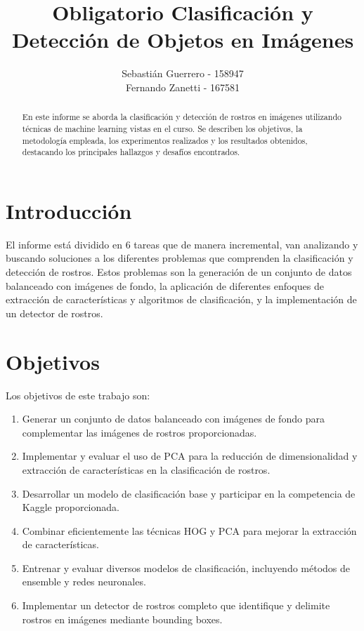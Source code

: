 \documentclass{article}
\title{Obligatorio Clasificación y Detección de Objetos en Imágenes}
\author{Sebastián Guerrero - 158947\\Fernando Zanetti - 167581}
\date{}
\begin{document}
\maketitle
\begin{abstract}
En este informe se aborda la clasificación y detección de rostros en imágenes utilizando técnicas de machine learning vistas en el curso. Se describen los objetivos, la metodología empleada, los experimentos realizados y los resultados obtenidos, destacando los principales hallazgos y desafíos encontrados.
\end{abstract}
\section*{Introducción}

El informe está dividido en 6 tareas que de manera incremental, van analizando y buscando soluciones a los diferentes problemas que comprenden la clasificación y detección de rostros. Estos problemas son la generación de un conjunto de datos balanceado con imágenes de fondo, la aplicación de diferentes enfoques de extracción de características y algoritmos de clasificación, y la implementación de un detector de rostros.

\section*{Objetivos}

Los objetivos de este trabajo son:

\begin{enumerate}
    \item Generar un conjunto de datos balanceado con imágenes de fondo para complementar las imágenes de rostros proporcionadas.
    \item Implementar y evaluar el uso de PCA para la reducción de dimensionalidad y extracción de características en la clasificación de rostros.
    \item Desarrollar un modelo de clasificación base y participar en la competencia de Kaggle proporcionada.
    \item Combinar eficientemente las técnicas HOG y PCA para mejorar la extracción de características.
    \item Entrenar y evaluar diversos modelos de clasificación, incluyendo métodos de ensemble y redes neuronales.
    \item Implementar un detector de rostros completo que identifique y delimite rostros en imágenes mediante bounding boxes.
\end{enumerate}
\end{document}
